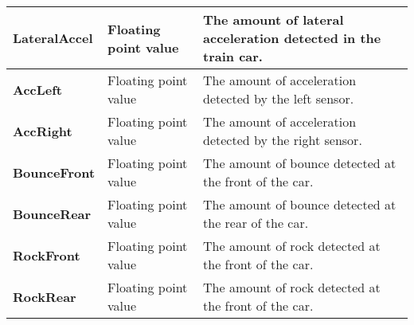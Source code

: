 \begin{table}[ht]
\begin{adjustbox}{max width=\textwidth}
\begin{tabular}{ |>{\columncolor[gray]{0.9}}l | l | l | }
\textbf{LateralAccel}   & Floating point value                   & The amount of lateral acceleration detected in the train car.  \\ \hline
\textbf{AccLeft}        & Floating point value                   & The amount of acceleration detected by the left sensor.  \\ \hline
\textbf{AccRight}       & Floating point value                   & The amount of acceleration detected by the right sensor.  \\ \hline
\textbf{BounceFront}    & Floating point value                   & The amount of bounce detected at the front of the car.  \\ \hline
\textbf{BounceRear}     & Floating point value                   & The amount of bounce detected at the rear of the car.  \\ \hline
\textbf{RockFront}      & Floating point value                   & The amount of rock detected at the front of the car.  \\ \hline
\textbf{RockRear}       & Floating point value                   & The amount of rock detected at the front of the car.  \\ \hline

\end{tabular}
\end{adjustbox}
\end{table}